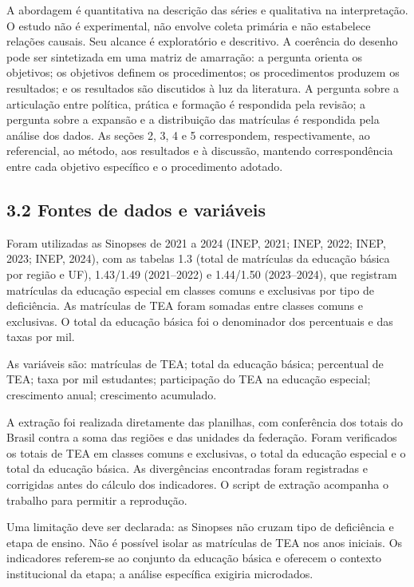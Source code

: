 A abordagem é quantitativa na descrição das séries e qualitativa na
interpretação. O estudo não é experimental, não envolve coleta primária
e não estabelece relações causais. Seu alcance é exploratório e
descritivo. A coerência do desenho pode ser sintetizada em uma matriz de
amarração: a pergunta orienta os objetivos; os objetivos definem os
procedimentos; os procedimentos produzem os resultados; e os resultados
são discutidos à luz da literatura. A pergunta sobre a articulação entre
política, prática e formação é respondida pela revisão; a pergunta sobre
a expansão e a distribuição das matrículas é respondida pela análise dos
dados. As seções 2, 3, 4 e 5 correspondem, respectivamente, ao
referencial, ao método, aos resultados e à discussão, mantendo
correspondência entre cada objetivo específico e o procedimento adotado.

\subsection{3.2 Fontes de dados e
variáveis}\label{fontes-de-dados-e-variuxe1veis}

Foram utilizadas as Sinopses de 2021 a 2024 (INEP, 2021; INEP, 2022;
INEP, 2023; INEP, 2024), com as tabelas 1.3 (total de matrículas da
educação básica por região e UF), 1.43/1.49 (2021--2022) e 1.44/1.50
(2023--2024), que registram matrículas da educação especial em classes
comuns e exclusivas por tipo de deficiência. As matrículas de TEA foram
somadas entre classes comuns e exclusivas. O total da educação básica
foi o denominador dos percentuais e das taxas por mil.

As variáveis são: matrículas de TEA; total da educação básica;
percentual de TEA; taxa por mil estudantes; participação do TEA na
educação especial; crescimento anual; crescimento acumulado.

A extração foi realizada diretamente das planilhas, com conferência dos
totais do Brasil contra a soma das regiões e das unidades da federação.
Foram verificados os totais de TEA em classes comuns e exclusivas, o
total da educação especial e o total da educação básica. As divergências
encontradas foram registradas e corrigidas antes do cálculo dos
indicadores. O script de extração acompanha o trabalho para permitir a
reprodução.

Uma limitação deve ser declarada: as Sinopses não cruzam tipo de
deficiência e etapa de ensino. Não é possível isolar as matrículas de
TEA nos anos iniciais. Os indicadores referem-se ao conjunto da educação
básica e oferecem o contexto institucional da etapa; a análise
específica exigiria microdados.

